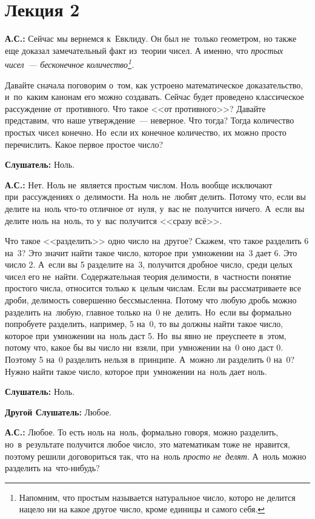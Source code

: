 \section{Лекция 2}
\label{2.2}

\textbf{А.С.:} Сейчас мы вернемся к~Евклиду. Он был не~только геометром, но также еще доказал замечательный факт
из~теории чисел. А именно, что \textit{простых чисел~--- бесконечное количество\footnote{Напомним,
что простым называется натуральное число, которо не делится нацело ни на какое другое число, кроме
единицы и самого себя.}.}


Давайте сначала поговорим о~том, как устроено математическое доказательство, и~по~каким канонам его
можно создавать. Сейчас будет проведено классическое рассуждение от~противного. Что такое <<от
противного>>? Давайте представим, что наше утверждение~--- неверное. Что тогда? Тогда количество простых
чисел конечно. Но~если их конечное количество, их можно просто перечислить. Какое первое простое
число?

\textbf{Слушатель:} Ноль.

\textbf{А.С.:} Нет. Ноль не~является простым числом. Ноль вообще исключают при~рассуждениях
о~делимости. На~ноль не~любят делить. Потому что, если вы делите на~ноль что-то отличное от~нуля,
у~вас не~получится ничего. А~если вы делите ноль на~ноль, то у~вас получится <<сразу всё>>.

Что такое <<разделить>> одно число на~другое? Скажем, что такое разделить 6 на~3? Это значит найти
такое число, которое при~умножении на~3 дает 6. Это число 2. А~если вы 5 разделите на~3, получится
дробное число, среди целых чисел его не~найти. Содержательная теория делимости, в~частности понятие
простого числа, относится только к~целым числам. Если вы рассматриваете все дроби, делимость совершенно
бессмысленна. Потому что любую дробь можно разделить на~любую, главное только на~0 не~делить.
Но~если вы формально попробуете разделить, например, 5 на~0, то вы должны найти такое число,
которое при~умножении на~ноль даст 5. Но~вы явно не~преуспеете в~этом, потому что, какое бы вы
число ни~взяли, при~умножении на~0 оно даст 0. Поэтому 5 на~0 разделить нельзя в~принципе. А~можно
ли разделить 0 на~0?\vadjust{\pagebreak} Нужно найти такое число, которое при~умножении на~ноль дает ноль.

\textbf{Слушатель:} Ноль.

\textbf{Другой Слушатель:} Любое.

\textbf{А.С.:} Любое. То есть ноль на~ноль, формально говоря, можно разделить, но~в~результате
получится любое число, это математикам тоже не~нравится, поэтому решили договориться так, что
на~ноль \textit{просто не~делят}. А~ноль можно разделить на~что-нибудь?

